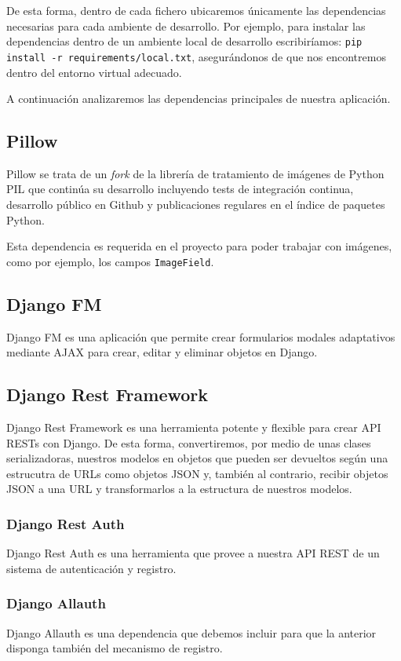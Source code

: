 De esta forma, dentro de cada fichero ubicaremos únicamente las dependencias necesarias para cada ambiente de desarrollo. Por ejemplo, para instalar las dependencias dentro de un ambiente local de desarrollo escribiríamos: \texttt{pip install -r requirements/local.txt}, asegurándonos de que nos encontremos dentro del entorno virtual adecuado.

A continuación analizaremos las dependencias principales de nuestra aplicación.

\subsection{Pillow}

Pillow \cite{Pillow} se trata de un \textit{fork} de la librería de tratamiento de imágenes de Python PIL que continúa su desarrollo incluyendo tests de integración continua, desarrollo público en Github y publicaciones regulares en el índice de paquetes Python. 

Esta dependencia es requerida en el proyecto para poder trabajar con imágenes, como por ejemplo, los campos \texttt{ImageField}.

\subsection{Django FM}

Django FM \cite{DjFM} es una aplicación que permite crear formularios modales adaptativos mediante AJAX para crear, editar y eliminar objetos en Django.

\subsection{Django Rest Framework}
Django Rest Framework \cite{DjRF} es una herramienta potente y flexible para crear API RESTs con Django. De esta forma, convertiremos, por medio de unas clases serializadoras, nuestros modelos en objetos que pueden ser devueltos según una estrucutra de URLs como objetos JSON y, también al contrario, recibir objetos JSON a una URL y transformarlos a la estructura de nuestros modelos.

\subsubsection{Django Rest Auth}
Django Rest Auth \cite{DjRA} es una herramienta que provee a nuestra API REST de un sistema de autenticación y registro.

\subsubsection{Django Allauth}
Django Allauth \cite{DjAllauth} es una dependencia que debemos incluir para que la anterior disponga también del mecanismo de registro. 

